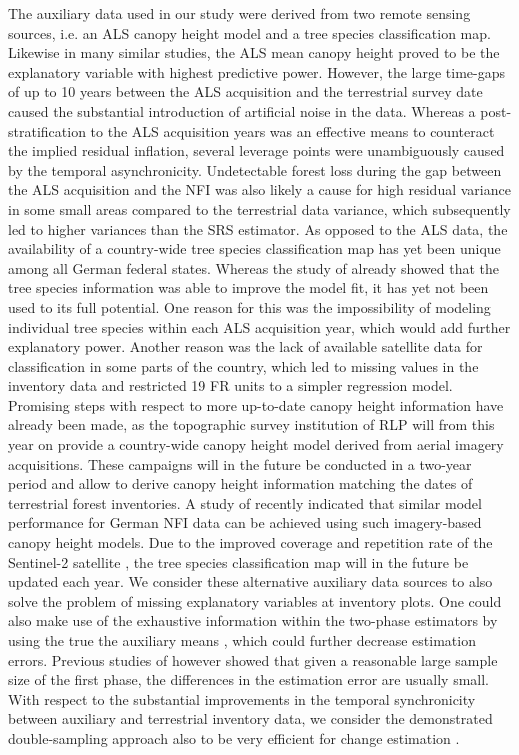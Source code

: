 \documentclass[remotesensing,article,submit,moreauthors,pdftex,10pt,a4paper]{mdpi}
\begin{document}
The auxiliary data used in our study were derived from two remote sensing sources, i.e. an ALS canopy height model and a tree species classification map. Likewise in many similar studies, the ALS mean canopy height proved to be the explanatory variable with highest predictive power. However, the large time-gaps of up to 10 years between the ALS acquisition and the terrestrial survey date caused the substantial introduction of artificial noise in the data. Whereas a post-stratification to the ALS acquisition years was an effective means to counteract the implied residual inflation, several leverage points were unambiguously caused by the temporal asynchronicity. Undetectable forest loss during the gap between the ALS acquisition and the NFI was also likely a cause for high residual variance in some small areas compared to the terrestrial data variance, which subsequently led to higher variances than the SRS estimator. As opposed to the ALS data, the availability of a country-wide tree species classification map has yet been unique among all German federal states. Whereas the study of \citet{hill2017a} already showed that the tree species information was able to improve the model fit, it has yet not been used to its full potential. One reason for this was the impossibility of modeling individual tree species within each ALS acquisition year, which would add further explanatory power. Another reason was the lack of available satellite data for classification in some parts of the country, which led to missing values in the inventory data and restricted 19 FR units to a simpler regression model. Promising steps with respect to more up-to-date canopy height information have already been made, as the topographic survey institution of RLP will from this year on provide a country-wide canopy height model derived from aerial imagery acquisitions. These campaigns will in the future be conducted in a two-year period and allow to derive canopy height information matching the dates of terrestrial forest inventories. A study of \citet{kirchhoefer2017} recently indicated that similar model performance for German NFI data can be achieved using such imagery-based canopy height models. Due to the improved coverage and repetition rate of the Sentinel-2 satellite \citep{sentinel2}, the tree species classification map will in the future be updated each year. We consider these alternative auxiliary data sources to also solve the problem of missing explanatory variables at inventory plots. One could also make use of the exhaustive information within the two-phase estimators by using the true the auxiliary means \citep{mandallaz2013a, mandallaz2013b}, which could further decrease estimation errors. Previous studies of \citet{mandallaz2013b} however showed that given a reasonable large sample size of the first phase, the differences in the estimation error are usually small. With respect to the substantial improvements in the temporal synchronicity between auxiliary and terrestrial inventory data, we consider the demonstrated double-sampling approach also to be very efficient for change estimation \citep{massey2015b}.\par
\end{document}
